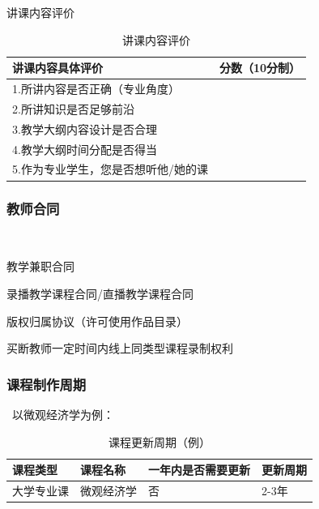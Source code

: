 讲课内容评价
\begin{table}[H]
  \centering
  \caption{讲课内容评价}
    \begin{tabular}{|p{14.335em}|r|}
    \hline
    \textcolor[rgb]{ .298,  .282,  .239}{讲课内容具体评价} & \multicolumn{1}{p{12.665em}|}{\textcolor[rgb]{ .298,  .282,  .239}{分数（10分制）}} \\
    \hline
    \textcolor[rgb]{ .298,  .282,  .239}{1.所讲内容是否正确（专业角度）} & \textcolor[rgb]{ .298,  .282,  .239}{} \\
    \hline
    \textcolor[rgb]{ .298,  .282,  .239}{2.所讲知识是否足够前沿} & \textcolor[rgb]{ .298,  .282,  .239}{} \\
    \hline
    \textcolor[rgb]{ .298,  .282,  .239}{3.教学大纲内容设计是否合理} & \textcolor[rgb]{ .298,  .282,  .239}{} \\
    \hline
    \textcolor[rgb]{ .298,  .282,  .239}{4.教学大纲时间分配是否得当} & \textcolor[rgb]{ .298,  .282,  .239}{} \\
    \hline
    \textcolor[rgb]{ .298,  .282,  .239}{5.作为专业学生，您是否想听他/她的课} & \textcolor[rgb]{ .298,  .282,  .239}{} \\
    \hline
    \end{tabular}%
  \label{tab:nrpf}%
\end{table}%


\subsubsection{教师合同}\

教学兼职合同

录播教学课程合同/直播教学课程合同

版权归属协议（许可使用作品目录）

买断教师一定时间内线上同类型课程录制权利

\subsubsection{课程制作周期}\
以微观经济学为例：
\begin{table}[H]
  \centering
  \caption{课程更新周期（例）}
    \begin{tabular}{|p{5.165em}|p{6.61em}|p{8.165em}|p{4.055em}|}
    \hline
    \textcolor[rgb]{ .298,  .282,  .239}{课程类型} & \textcolor[rgb]{ .298,  .282,  .239}{课程名称} & \textcolor[rgb]{ .298,  .282,  .239}{一年内是否需要更新} & \textcolor[rgb]{ .298,  .282,  .239}{更新周期} \\
    \hline
    \textcolor[rgb]{ .298,  .282,  .239}{大学专业课} & \textcolor[rgb]{ .298,  .282,  .239}{微观经济学} & \textcolor[rgb]{ .298,  .282,  .239}{否} & \textcolor[rgb]{ .298,  .282,  .239}{2-3年} \\
    \hline
    \end{tabular}%
  \label{tab:kcgxzq}%
\end{table}%


